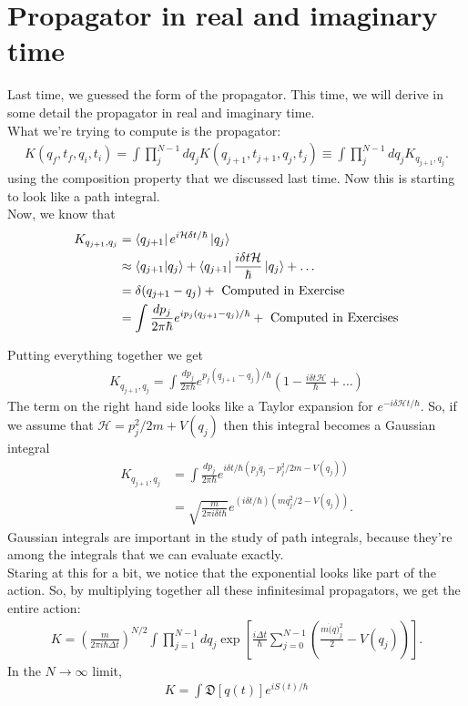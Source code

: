 \documentclass{book}
\theoremstyle{definition}
\newcommand{\nn}{\nonumber}
\newcommand{\had}{\mathcal{H}}
\newcommand{\f}[2]{\frac{#1}{#2}}
\newcommand{\lp}{\left(}
\newcommand{\rp}{\right)}
\newcommand{\lb}{\left[}
\newcommand{\rb}{\right]}
\begin{document}
\newpage
\section{Propagator in real and imaginary time}


Last time, we guessed the form of the propagator. This time, we will derive in some detail the propagator in real and imaginary time. \\


What we're trying to compute is the propagator:
\begin{align}
K(q_f, t_f,q_i ,t_i) =  \int \prod_j^{N-1}   dq_j K (q_{j+1},t_{j+1}, q_j , t_j) \equiv  \int \prod_j^{N-1}   dq_j K_{q_{j+1},q_j}.
\end{align}
using the composition property that we discussed last time. Now this is starting to look like a path integral. \\

Now, we know that
\begin{align}
K_{q_{j+1},q_j} &= \bra{q_{j+1}}  e^{i\had \delta t/\hbar}  \ket{q_j}\nn\\
&\approx \braket{q_{j+1}}{q_j}   +  \bra{q_{j+1}}  \f{i\delta t \had}{\hbar} \ket{q_j} + \dots\nn\\
&= \delta(q_{j+1} - q_j) + \text{ Computed in Exercise } \nn\\
&= \int \f{dp_j}{2\pi \hbar} e^{ip_j(q_{j+1} - q_j)/\hbar} +  \text{ Computed in Exercises}
\end{align}

Putting everything together we get
\begin{align}
K_{q_{j+1},q_j} = \int \f{dp_j}{2\pi \hbar} e^{p_j(q_{j+1} - q_j)/\hbar}\lp 1 - \f{i\delta t \had}{\hbar} + \dots \rp
\end{align}
The term on the right hand side looks like a Taylor expansion for $e^{-i\delta \had t /\hbar}$. So, if we assume that $\had =  p_j^2 / 2m + V(q_j)$ then this integral becomes a Gaussian integral
\begin{align}
K_{q_{j+1},q_j} &= \int \f{dp_j}{2\pi \hbar} e^{i\delta t/\hbar (p_j\dot{q}_j  - p_j^2/2m - V(q_j) )  } \nn\\
&= \sqrt{\f{m}{2\pi i \delta t \hbar}} e^{(i\delta t /\hbar) ( mq_j^2/2 - V(q_j) )}.
\end{align}
Gaussian integrals are important in the study of path integrals, because they're among the integrals that we can evaluate exactly. \\

Staring at this for a bit, we notice that the exponential looks like part of the action. So, by multiplying together all these infinitesimal propagators, we get the entire action:
\begin{align}
K = \lp \f{m}{2\pi i \hbar \Delta t} \rp^{N/2} \int \prod^{N-1}_{j=1} dq_j \exp\lb \f{i \Delta t}{\hbar} \sum^{N-1}_{j=0} \lp \f{m\dot(q)_j^2}{2} - V(q_j) \rp \rb.
\end{align}
In the $N\to \infty$ limit, 
\begin{align}
K = \int \mathfrak{D}[q(t)] e^{iS(t)/\hbar}
\end{align}
\end{document}
